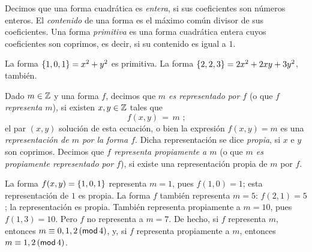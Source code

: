 \begin{defDefiniciones}\label{def:definiciones:entera}
	Decimos que una forma cuadr\'atica es \emph{entera},
	si sus coeficientes son n\'umeros enteros.
	El \emph{contenido} de una forma es el m\'aximo com\'un
	divisor de sus coeficientes.
	Una forma \emph{primitiva} es una forma cuadr\'atica
	entera cuyos coeficientes son coprimos, es decir, si
	su contenido es igual a $1$.
\end{defDefiniciones}


\begin{ejemDefiniciones}\label{ejem:definiciones:primitiva}
	La forma $\binaria{1,0,1}=x^2+y^2$ es primitiva.
	La forma $\binaria{2,2,3}=2x^2+2xy+3y^2$, tambi\'en.
\end{ejemDefiniciones}

\begin{defDefiniciones}\label{def:definiciones:representacion}
	Dado $m\in\Enteros$ y una forma $f$, decimos que
	\emph{$m$ es representado por $f$} (o que \emph{$f$ %
	representa $m$}), si existen $x,y\in\Enteros$ tales que
	\begin{displaymath}
		f(x,y)\,=\,m
		\text{ ;}
	\end{displaymath}
	el par $(x,y)$ soluci\'on de esta ecuaci\'on, o bien la
	expresi\'on $f(x,y)=m$ es una \emph{representaci\'on de $m$ %
	por la forma $f$}. Dicha representaci\'on se dice
	\emph{propia}, si $x$ e $y$ son coprimos. Decimos que
	\emph{$f$ representa propiamente a $m$} (o que
	\emph{$m$ es propiamente representado por $f$}), si
	existe una representaci\'on propia de $m$ por $f$.
\end{defDefiniciones}

\begin{ejemDefiniciones}\label{ejem:definiciones:representacion}
	La forma $f(x,y)=\binaria{1,0,1}$ representa $m=1$, pues
	$f(1,0)=1$; esta representaci\'on de $1$ es propia. La forma
	$f$ tambi\'en representa $m=5$: $f(2,1)=5$; la representaci\'on
	es propia. Tambi\'en representa propiamente a $m=10$, pues
	$f(1,3)=10$. Pero $f$ no representa a $m=7$. De hecho, si $f$
	representa $m$, entonces $m\equiv 0,1,2\tmodulo[4]$, y, si $f$
	representa propiamente a $m$, entonces $m\equiv 1,2\tmodulo[4]$.
\end{ejemDefiniciones}

